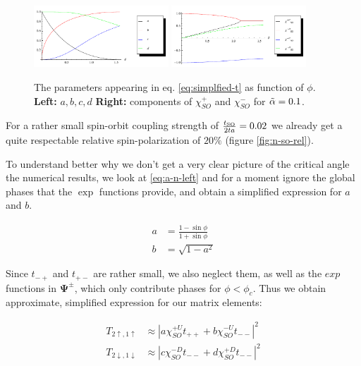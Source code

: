\begin{figure}
    \begin{center}
        \includegraphics[width=0.45\textwidth]{parameters-abcd.pdf}%
        \hspace{0.05\textwidth}%
        \includegraphics[width=0.45\textwidth]{parameters-chi.pdf}
    \end{center}
    \caption{The parameters appearing in eq. \ref{eq:simplfied-t} as function
        of $\phi$. \textbf{Left: } $a, b, c, d$ \textbf{Right: } components of
            $\chi_{SO}^+$ and $\chi_{SO}^-$ for $\tilde \alpha = 0.1$.}
    \label{fig:simplfieid-parmas}
\end{figure}

For a rather small spin-orbit coupling strength of $\frac{t_{\textnormal{SO}}}{2 t a} = 0.02$
we already get a quite respectable relative spin-polarization of $20\%$
(figure \ref{fig:n-so-rel}).

To understand better why we don't get a very clear picture of the critical
angle the numerical results, we look at \ref{eq:a-n-left} and for a moment
ignore the global phases that the $\exp$ functions provide, and obtain a
simplified expression for $a$ and $b$.


\begin{align}
   a &= \frac{1-\sin \phi}{1 + \sin\phi} \nonumber\\
   b &= \sqrt{1-a^2}
\end{align}

Since $t_{-+}$ and $t_{+-}$ are rather small, we also neglect them, as well as
the $exp$ functions in $\mathbf{\Psi^\pm}$, which only contribute phases for
$\phi < \phi_c$. Thus we obtain approximate, 
simplified expression for our matrix elements:

\begin{align}
    T_{2\uparrow,1\uparrow}     &\approx \left|a \chi_{SO}^{+U} t_{++}
            + b \chi_{SO}^{-U} t_{--} \right|^2\nonumber\\
    T_{2\downarrow,1\downarrow} &\approx \left|c \chi_{SO}^{-D} t_{--}
            + d \chi_{SO}^{+D} t_{--} \right|^2
    \label{eq:simplfied-t}
\end{align}

